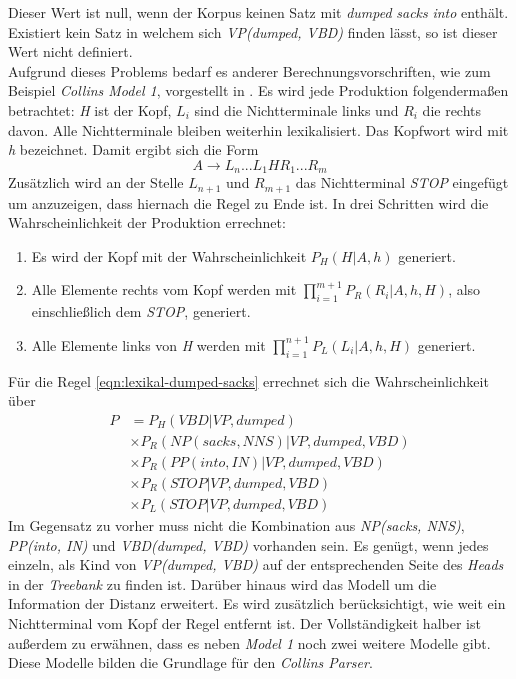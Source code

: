 Dieser Wert ist null, wenn der Korpus keinen Satz mit \textit{dumped} \textit{sacks} \textit{into} enthält. Existiert kein Satz in welchem sich \textit{VP(dumped, VBD)} finden lässt, so ist dieser Wert nicht definiert. \\
Aufgrund dieses Problems bedarf es anderer Berechnungsvorschriften, wie zum Beispiel \textit{Collins Model 1}, vorgestellt in \cite{collinsModel}. 
Es wird jede Produktion folgendermaßen betrachtet: \textit{H} ist der Kopf, \( L_i \) sind die Nichtterminale links und \( R_i \) die rechts davon. Alle Nichtterminale bleiben weiterhin lexikalisiert. Das Kopfwort wird mit \textit{h} bezeichnet. Damit ergibt sich die Form
\[ A \to L_n...L_1 H R_1...R_m \]
Zusätzlich wird an der Stelle \( L_{n+1} \) und \( R_{m+1} \) das Nichtterminal \textit{STOP} eingefügt um anzuzeigen, dass hiernach die Regel zu Ende ist. In drei Schritten wird die Wahrscheinlichkeit der Produktion errechnet:
\begin{enumerate}
\item Es wird der Kopf mit der Wahrscheinlichkeit \( P_H(H | A, h) \) generiert.
\item Alle Elemente rechts vom Kopf werden mit \( \displaystyle\prod_{i = 1}^{m+1} P_R(R_i | A, h, H) \), also einschließlich dem \textit{STOP}, generiert.
\item Alle Elemente links von \textit{H} werden mit \( \displaystyle\prod_{i = 1}^{n+1} P_L(L_i | A, h, H) \) generiert.
\end{enumerate}
Für die Regel \ref{eqn:lexikal-dumped-sacks} errechnet sich die Wahrscheinlichkeit über
\begin{align}
P & = P_H(VBD|VP, dumped) \nonumber \\ & \times P_R(NP(sacks, NNS)|VP, dumped, VBD) \nonumber \\ & \times P_R(PP(into, IN)|VP, dumped, VBD) \nonumber \\ & \times P_R(STOP|VP, dumped, VBD) \nonumber \\ & \times P_L(STOP|VP, dumped, VBD)
\end{align}
Im Gegensatz zu vorher muss nicht die Kombination aus \textit{NP(sacks, NNS)}, \textit{PP(into, IN)} und \textit{VBD(dumped, VBD)} vorhanden sein. Es genügt, wenn jedes einzeln, als Kind von \textit{VP(dumped, VBD)} auf der entsprechenden Seite des \textit{Heads} in der \textit{Treebank} zu finden ist. %
Darüber hinaus wird das Modell um die Information der Distanz erweitert. Es wird zusätzlich berücksichtigt, wie weit ein Nichtterminal vom Kopf der Regel entfernt ist. 
Der Vollständigkeit halber ist außerdem zu erwähnen, dass es neben \textit{Model 1} noch zwei weitere Modelle gibt. Diese Modelle bilden die Grundlage für den \textit{Collins Parser}. \cite{collinsModel}\cite[Kapitel 12]{nlpGrundlagen}
